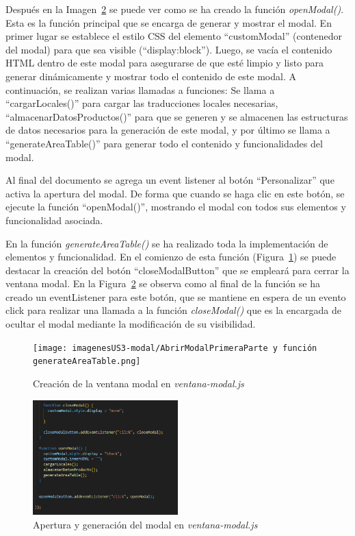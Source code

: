 \documentclass[12pt]{article}
\begin{document}
Después en la Imagen~\ref{fig:finaljs} se puede ver como se ha creado la función \textit{openModal()}. Esta es la función principal que se encarga
de generar y mostrar el modal. En primer lugar se establece el estilo CSS del elemento ``customModal'' (contenedor del modal) para que sea visible (``display:block'').
Luego, se vacía el contenido HTML dentro de este modal para asegurarse de que esté limpio y listo para generar dinámicamente y mostrar todo el contenido de este modal.
A continuación, se realizan varias llamadas a funciones: Se llama a ``cargarLocales()'' para cargar las traducciones locales necesarias, ``almacenarDatosProductos()'' para que se generen
y se almacenen las estructuras de datos necesarios para la generación de este modal, y por último se llama a ``generateAreaTable()'' para generar todo el contenido y funcionalidades
del modal. 

Al final del documento se agrega un event listener al botón ``Personalizar'' que activa la apertura del modal. De forma que cuando se haga clic en este botón, se 
ejecute la función ``openModal()'', mostrando el modal con todos sus elementos y funcionalidad asociada.

En la función \textit{generateAreaTable()} se ha realizado toda la implementación de elementos y funcionalidad. En el comienzo de esta función (Figura~\ref{fig:iniciojs}) se puede destacar la creación del botón
``closeModalButton'' que se empleará para cerrar la ventana modal. En la Figura~\ref{fig:finaljs} se observa como al final de la función se ha creado un eventListener para este botón, que se mantiene en espera de un evento
click para realizar una llamada a la función \textit{closeModal()} que es la encargada de ocultar el modal mediante la modificación de su visibilidad.

\begin{figure}[ht]
    \centering
    \texttt{[image: imagenesUS3-modal/AbrirModalPrimeraParte y función generateAreaTable.png]}
    \caption{\label{fig:iniciojs} Creación de la ventana modal en \textit{ventana-modal.js}}
    \vspace{\fill}
\end{figure}



\begin{figure}[ht]
    \centering
    \includegraphics[width=0.5\textwidth]{imagenesUS3-modal/FinalDeOpenModal.png}
    \caption{\label{fig:finaljs} Apertura y generación del modal en \textit{ventana-modal.js}}
    \vspace{\fill}
\end{figure}
\end{document}
